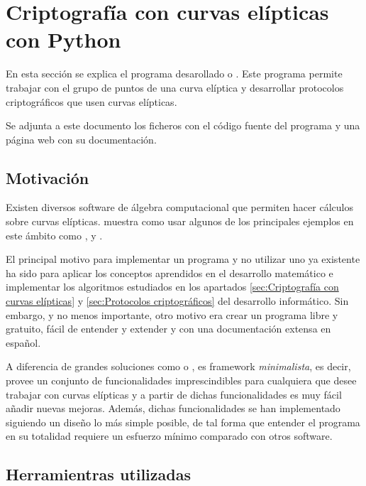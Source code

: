 \section{Criptografía con curvas elípticas con Python}
\label{sec:Criptografía con curvas elípticas con Python}

En esta sección se explica el programa desarollado  o . Este programa permite trabajar con el grupo de puntos de una curva elíptica y desarrollar protocolos criptográficos que usen curvas elípticas.

Se adjunta a este documento los ficheros con el código fuente del programa y una página web con su documentación.

\subsection{Motivación}
\label{sub:Motivación}

Existen diversos software de álgebra computacional que permiten hacer cálculos sobre curvas elípticas. \cite{Washington:2008} muestra como usar algunos de los principales ejemplos en este ámbito como ,  y .

El principal motivo para implementar un programa y no utilizar uno ya existente ha sido para aplicar los conceptos aprendidos en el desarrollo matemático e implementar los algoritmos estudiados en los apartados \ref{sec:Criptografía con curvas elípticas} y \ref{sec:Protocolos criptográficos} del desarrollo informático. Sin embargo, y no menos importante, otro motivo era crear un programa libre y gratuito,
fácil de entender y extender y con una documentación extensa en español.

A diferencia de grandes soluciones como  o ,  es framework \emph{minimalista}, es decir, provee un conjunto de funcionalidades imprescindibles para cualquiera que desee trabajar con curvas elípticas y a partir de dichas funcionalidades es muy fácil añadir nuevas mejoras. Además, dichas funcionalidades se han implementado siguiendo un diseño lo más simple posible, de tal forma que entender el programa en su totalidad requiere un esfuerzo mínimo comparado con otros software.

\subsection{Herramientras utilizadas}
\label{sub:Herramientras utilizadas}

